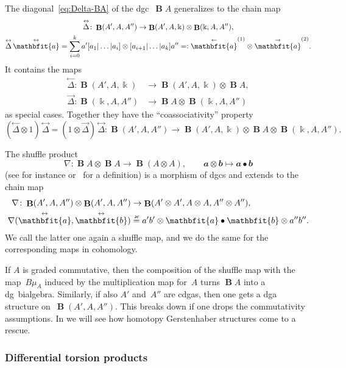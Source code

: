 \documentclass[letterpaper]{amsart}
\numberwithin{equation}{section}
\theoremstyle{plain}
\theoremstyle{definition}
\theoremstyle{remark}
\DeclareMathOperator{\BB}{\mathbf{B}}
\def\kk{\Bbbk}
\def\aa{\mathbfit{a}}
\def\laa{\overset{\text{$\leftarrow$}}{\aa}}
\def\raa{\overset{\text{$\rightarrow$}}{\aa}}
\def\taa{\overset{\text{$\leftrightarrow$}}{\aa}}
\def\bb{\mathbfit{b}}
\def\tbb{\overset{\text{$\leftrightarrow$}}{\bb}}
\def\lDelta{\overset{\text{$\leftarrow$}}{\Delta}}
\def\rDelta{\overset{\text{$\rightarrow$}}{\Delta}}
\def\tDelta{\overset{\text{$\leftrightarrow$}}{\Delta}}
\def\swee#1#2{#1^{(#2)}}
\let\KS\varkappa
\def\eqKS{\stackrel{\KS}{=}}
\let\shuffle\nabla
\begin{document}
The diagonal~\eqref{eq:Delta-BA} of the dgc~$\BB A$ generalizes to the chain map
\begin{gather}
  \label{eq:Delta-AAA}
  \tDelta\colon \BB(A',A,A'') \to \BB(A',A,\kk) \otimes \BB(\kk,A,A''), \\
  \notag \tDelta\,\taa %
  = \sum_{i=0}^{k} a'[a_{1}|\dots|a_{i}]\otimes[a_{i+1}|\dots|a_{k}]a'' =\vcentcolon \swee{\laa}{1}\otimes\swee{\raa}{2}.
\end{gather}
It contains the maps
\begin{align}
  \lDelta\colon \BB(A',A,\kk) &\to \BB(A',A,\kk) \otimes \BB A, \\
  \rDelta\colon \BB(\kk,A,A'') &\to \BB A \otimes \BB(\kk,A,A'')
\end{align}
as special cases. Together they have the ``coassociativity'' property
\begin{equation}
  (\lDelta\otimes 1)\,\tDelta = (1\otimes\rDelta)\,\tDelta\colon
  \BB(A',A,A'') \to \BB(A',A,\kk) \otimes \BB A \otimes \BB(\kk,A,A'').
\end{equation}

The shuffle product
\begin{equation}
  \label{eq:def-shuffle}
  \shuffle\colon \BB A \otimes \BB A \to \BB(A\otimes A),
  \qquad
  \aa\otimes\bb \mapsto \aa \bullet \bb
\end{equation}
(see for instance \cite[p.~247]{McCleary:2001} or~\cite[Ex.~2.1]{Franz:homog} for a definition)
is a morphism of dgcs and extends to the chain map
\begin{align}
  \label{eq:def-shuffle-twosided}
  \shuffle\colon \BB(A',A,A'') \otimes \BB(A',A,A'') &\to \BB(A'\otimes A',A\otimes A,A''\otimes A''), \\
  \notag \shuffle(\taa,\tbb) &\eqKS a'b' \otimes \aa \bullet \bb \otimes a''b''.
\end{align}
We call the latter one again a shuffle map, and we do the same for the corresponding maps in cohomology.

If $A$ is graded commutative, then the composition of the shuffle map with the map~$B\mu_{A}$
induced by the multiplication map for~$A$ turns $\BB A$ into a dg~bialgebra.
Similarly, if also $A'$ and~$A''$ are cdgas, then one gets a dga structure on~$\BB(A',A,A'')$.
This breaks down if one drops the commutativity assumptions. In  we will see
how homotopy Gerstenhaber structures come to a rescue.


\subsubsection{Differential torsion products}
\label{sec:diff-tor}
\end{document}
